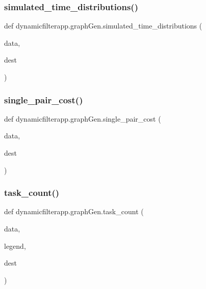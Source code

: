 \subsubsection{\texorpdfstring{simulated\+\_\+time\+\_\+distributions()}{simulated\_time\_distributions()}}
{\footnotesize\ttfamily def dynamicfilterapp.\+graph\+Gen.\+simulated\+\_\+time\+\_\+distributions (\begin{DoxyParamCaption}\item[{}]{data,  }\item[{}]{dest }\end{DoxyParamCaption})}

\mbox{\label{namespacedynamicfilterapp_1_1graph_gen_a09e4e7b19b279838511f1806d4f7f2bd}} 
\subsubsection{\texorpdfstring{single\+\_\+pair\+\_\+cost()}{single\_pair\_cost()}}
{\footnotesize\ttfamily def dynamicfilterapp.\+graph\+Gen.\+single\+\_\+pair\+\_\+cost (\begin{DoxyParamCaption}\item[{}]{data,  }\item[{}]{dest }\end{DoxyParamCaption})}

\mbox{\label{namespacedynamicfilterapp_1_1graph_gen_a8db1f76661e4aea8b1d2145681ae2696}} 
\subsubsection{\texorpdfstring{task\+\_\+count()}{task\_count()}}
{\footnotesize\ttfamily def dynamicfilterapp.\+graph\+Gen.\+task\+\_\+count (\begin{DoxyParamCaption}\item[{}]{data,  }\item[{}]{legend,  }\item[{}]{dest }\end{DoxyParamCaption})}

